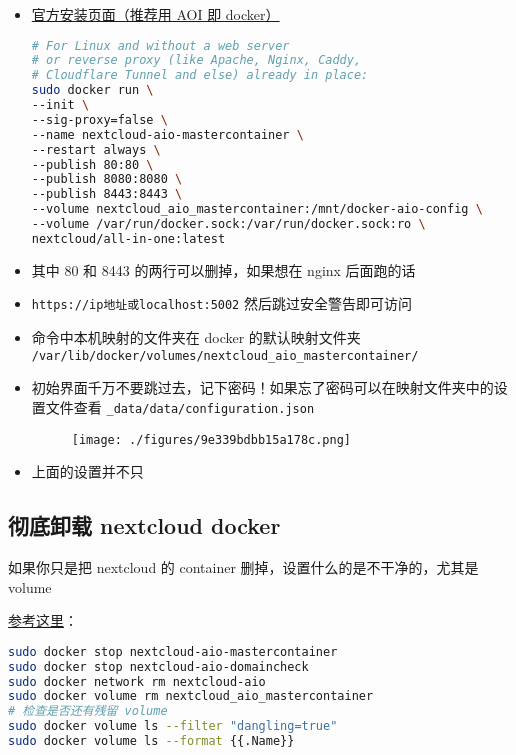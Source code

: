 
\begin{itemize}
\item \href{https://nextcloud.com/install/}{官方安装页面（推荐用 AOI 即 docker）}
\begin{lstlisting}[language=bash]
# For Linux and without a web server
# or reverse proxy (like Apache, Nginx, Caddy,
# Cloudflare Tunnel and else) already in place:
sudo docker run \
--init \
--sig-proxy=false \
--name nextcloud-aio-mastercontainer \
--restart always \
--publish 80:80 \
--publish 8080:8080 \
--publish 8443:8443 \
--volume nextcloud_aio_mastercontainer:/mnt/docker-aio-config \
--volume /var/run/docker.sock:/var/run/docker.sock:ro \
nextcloud/all-in-one:latest
\end{lstlisting}
\item 其中 80 和 8443 的两行可以删掉，如果想在 nginx 后面跑的话
\item \verb`https://ip地址或localhost:5002` 然后跳过安全警告即可访问
\item 命令中本机映射的文件夹在 docker 的默认映射文件夹 \verb`/var/lib/docker/volumes/nextcloud_aio_mastercontainer/`
\item 初始界面千万不要跳过去，记下密码！如果忘了密码可以在映射文件夹中的设置文件查看 \verb`_data/data/configuration.json`
\begin{figure}[ht]
\centering
\texttt{[image: ./figures/9e339bdbb15a178c.png]}
\caption{} \label{fig_nxclou_1}
\end{figure}
\item 上面的设置并不只
\end{itemize}

\subsection{彻底卸载 nextcloud docker}
如果你只是把 nextcloud 的 container 删掉，设置什么的是不干净的，尤其是 volume

\href{https://github.com/nextcloud/all-in-one#how-to-properly-reset-the-instance}{参考这里}：
\begin{lstlisting}[language=bash]
sudo docker stop nextcloud-aio-mastercontainer
sudo docker stop nextcloud-aio-domaincheck
sudo docker network rm nextcloud-aio
sudo docker volume rm nextcloud_aio_mastercontainer
# 检查是否还有残留 volume
sudo docker volume ls --filter "dangling=true"
sudo docker volume ls --format {{.Name}}
\end{lstlisting}
